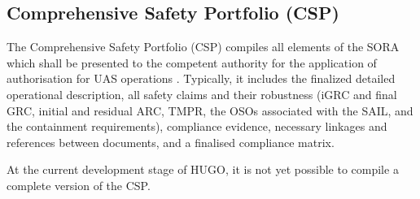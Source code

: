 \subsection{Comprehensive Safety Portfolio (CSP)}
The Comprehensive Safety Portfolio (CSP) compiles all elements of the SORA which shall be presented to the competent authority for the application of authorisation for UAS operations \cite{Jarus_Annex_F}. Typically, it includes the finalized detailed operational description, all safety claims and their robustness (iGRC and final GRC, initial and residual ARC, TMPR, the OSOs associated with the SAIL, and the containment requirements), compliance evidence, necessary linkages and references between documents, and a finalised compliance matrix.

At the current development stage of HUGO, it is not yet possible to compile a complete version of the CSP.
